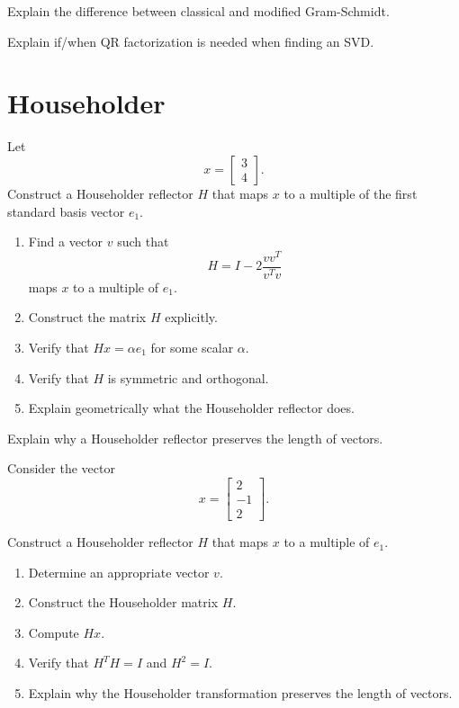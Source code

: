 \documentclass{ximera}
\begin{document}
\begin{exercise}
    Explain the difference between classical and modified Gram-Schmidt.
\end{exercise}

\begin{exercise}
    Explain if/when QR factorization is needed when finding an SVD.
\end{exercise}

\section{Householder}

    
\begin{exercise}
Let
\[
x=\begin{bmatrix}3\\4\end{bmatrix}.
\]
Construct a Householder reflector $H$ that maps $x$ to a multiple of the first standard basis vector $e_1$.

\begin{enumerate}
    \item Find a vector $v$ such that
    \[
    H=I-2\frac{vv^T}{v^Tv}
    \]
    maps $x$ to a multiple of $e_1$.
    \item Construct the matrix $H$ explicitly.
    \item Verify that $Hx=\alpha e_1$ for some scalar $\alpha$.
    \item Verify that $H$ is symmetric and orthogonal.
    \item Explain geometrically what the Householder reflector does.
\end{enumerate}
\end{exercise}

\begin{exercise}
    Explain why a Householder reflector preserves the length of vectors.
\end{exercise}
\begin{exercise}
Consider the vector
\[
x=\begin{bmatrix}2\\-1\\2\end{bmatrix}.
\]

Construct a Householder reflector $H$ that maps $x$ to a multiple of $e_1$.

\begin{enumerate}
    \item Determine an appropriate vector $v$.
    \item Construct the Householder matrix $H$.
    \item Compute $Hx$.
    \item Verify that $H^TH=I$ and $H^2=I$.
    \item Explain why the Householder transformation preserves the length of vectors.
\end{enumerate}
\end{exercise}
\end{document}
